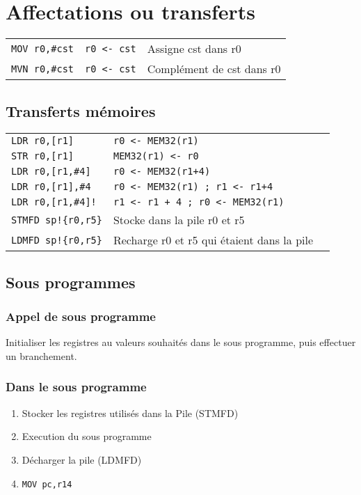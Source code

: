 \documentclass{article}
\begin{document}
\section{Affectations ou transferts} 
\begin{tabular}{p{3cm}p{3.6cm}l}
	\texttt{MOV r0,\#cst} & \texttt{r0 <- cst} & Assigne cst dans r0\\
	\texttt{MVN r0,\#cst} & \texttt{r0 <- cst} & Complément de cst dans r0\\
\end{tabular}
\subsection{Transferts mémoires}
\begin{tabular}{p{3cm}p{6.6cm}l}
	\texttt{LDR r0,[r1]} & \texttt{r0 <- MEM32(r1)}&\\
	\texttt{STR r0,[r1]} & \texttt{MEM32(r1) <- r0}&\\
	\texttt{LDR r0,[r1,\#4]} & \texttt{r0 <- MEM32(r1+4)}&\\
	\texttt{LDR r0,[r1],\#4} & \texttt{r0 <- MEM32(r1) ; r1 <- r1+4}&\\
	\texttt{LDR r0,[r1,\#4]!} & \texttt{r1 <- r1 + 4 ; r0 <- MEM32(r1)}&\\
	\texttt{STMFD sp!\{r0,r5\}} &  Stocke dans la pile r0 et r5\\
	\texttt{LDMFD sp!\{r0,r5\}} &  Recharge r0 et r5 qui étaient dans la pile\\
\end{tabular}
\subsection{Sous programmes}
\subsubsection{Appel de sous programme}
	Initialiser les registres au valeurs souhaités dans le sous programme, puis effectuer un branchement.
\subsubsection{Dans le sous programme}
\begin{enumerate}
	\item Stocker les registres utilisés dans la Pile (STMFD)
	\item Execution du sous programme
	\item Décharger la pile (LDMFD)
	\item \texttt{MOV pc,r14}
\end{enumerate}
\end{document}
